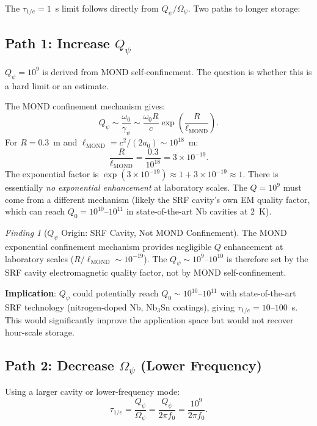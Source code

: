 \documentclass[11pt]{article}
\theoremstyle{definition}
\theoremstyle{remark}
\newtheorem{finding}[theorem]{Finding}
\newcommand{\ee}[1]{\times10^{#1}}
\newcommand{\Qpsi}{Q_\psi}
\newcommand{\Opsi}{\Omega_\psi}
\begin{document}
The $\tau_{1/e} = 1$~s limit follows directly from $\Qpsi/\Opsi$.
Two paths to longer storage:

\subsection{Path 1: Increase $\Qpsi$}

$\Qpsi = 10^9$ is derived from MOND self-confinement. The question is
whether this is a hard limit or an estimate.

The MOND confinement mechanism gives:
\begin{equation}
\Qpsi \sim \frac{\omega_0}{\gamma_\psi}
\sim \frac{\omega_0 R}{c} \exp\!\left(\frac{R}{\ell_{\mathrm{MOND}}}\right).
\end{equation}
For $R = 0.3$~m and $\ell_{\mathrm{MOND}} = c^2/(2a_0) \sim 10^{18}$~m:
\begin{equation}
\frac{R}{\ell_{\mathrm{MOND}}} = \frac{0.3}{10^{18}} = 3\ee{-19}.
\end{equation}
The exponential factor is $\exp(3\ee{-19}) \approx 1 + 3\ee{-19}
\approx 1$. There is essentially \emph{no exponential enhancement} at
laboratory scales. The $Q = 10^9$ must come from a different mechanism
(likely the SRF cavity's own EM quality factor, which can reach
$Q_0 = 10^{10}$--$10^{11}$ in state-of-the-art Nb cavities at 2~K).

\begin{finding}[$\Qpsi$ Origin: SRF Cavity, Not MOND Confinement]
\label{finding:Q-origin}
The MOND exponential confinement mechanism provides negligible $Q$
enhancement at laboratory scales ($R/\ell_{\mathrm{MOND}} \sim 10^{-19}$).
The $\Qpsi \sim 10^9$--$10^{10}$ is therefore set by the SRF cavity
electromagnetic quality factor, not by MOND self-confinement.

\textbf{Implication}: $\Qpsi$ could potentially reach
$Q_0 \sim 10^{10}$--$10^{11}$ with state-of-the-art SRF technology
(nitrogen-doped Nb, Nb$_3$Sn coatings), giving
$\tau_{1/e} = 10$--$100$~s. This would significantly improve the
application space but would not recover hour-scale storage.
\end{finding}

\subsection{Path 2: Decrease $\Opsi$ (Lower Frequency)}

Using a larger cavity or lower-frequency mode:
\begin{equation}
\tau_{1/e} = \frac{\Qpsi}{\Opsi}
= \frac{\Qpsi}{2\pi f_0}
= \frac{10^9}{2\pi f_0}.
\end{equation}
\end{document}
